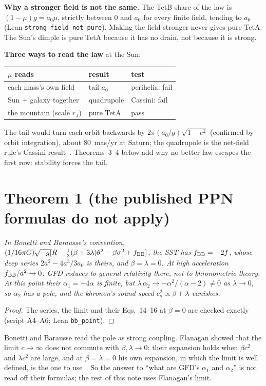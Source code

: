 \documentclass[twocolumn]{iopjournal}
\begin{document}
\textbf{Why a stronger field is not the same.} The TetB share of the
law is $(1-\mu)g = a_0\mu$, strictly between $0$ and $a_0$ for every
finite field, tending to $a_0$ (Lean \texttt{strong\_field\_not\_pure}).
Making the field stronger never gives pure TetA. The Sun's dimple is
pure TetA because it has no drain, not because it is strong.

\textbf{Three ways to read the law} at the Sun:
\begin{center}
\small
\begin{tabular}{@{}lll@{}}
$\mu$ reads & result & test\\\hline
each mass's own field & tail $a_0$ & perihelia: fail\\
Sun + galaxy together & quadrupole & Cassini: fail\\
the mountain (scale $r_J$) & pure TetA & pass
\end{tabular}
\end{center}
The tail would turn each orbit backwards by
$2\pi(a_0/g)\sqrt{1-e^2}$ (confirmed by orbit integration), about
80~mas/yr at Saturn; the quadrupole is the net-field rule's
Cassini result~\cite{NelsonNFR}. Theorems~3--4 below add why no
better law escapes the first row: stability forces the tail.


\section*{Theorem 1 (the published PPN formulas do not apply)}

\emph{In Bonetti and Barausse's convention,
$(1/16\pi G)\sqrt{-g}[R - \tfrac13(\beta+3\lambda)\theta^2 -
\beta\sigma^2 + f_{\rm BB}]$, the SST has $f_{\rm BB} = -2f$, whose
deep series $2a^2 - 4a^3/3a_0$ is theirs, and $\beta = \lambda = 0$.
At high acceleration $f_{\rm BB}/a^2 \to 0$: GFD reduces to general
relativity there, not to khronometric theory. At this point their
$\alpha_1 = -4\alpha$ is finite, but
$\lambda\,\alpha_2 \to -\alpha^2/(\alpha - 2) \ne 0$ as
$\lambda \to 0$, so $\alpha_2$ has a pole, and the khronon's sound
speed $c_s^2 \propto \beta + \lambda$ vanishes.}

\begin{proof}
The series, the limit and their Eqs.~14--16 at $\beta = 0$ are
checked exactly (script A4--A6; Lean \texttt{bb\_point}).
\end{proof}

Bonetti and Barausse read the pole as strong coupling. Flanagan showed
that the limit $c \to \infty$ does not commute with
$\beta, \lambda \to 0$: their expansion holds when $\beta c^2$ and
$\lambda c^2$ are large, and at $\beta = \lambda = 0$ his own
expansion, in which the limit is well defined, is the one to
use~\cite{Flanagan2023}. So the answer to ``what are GFD's $\alpha_1$
and $\alpha_2$'' is not read off their formulas; the rest of this
note uses Flanagan's limit.
\end{document}
